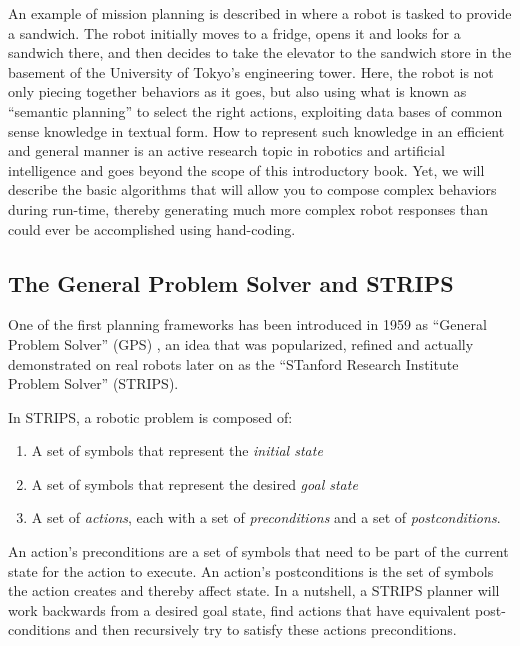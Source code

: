 An example of mission planning is described in \cite{saito2011semantic} where a robot is tasked to provide a sandwich. The robot initially moves to a fridge, opens it and looks for a sandwich there, and then decides to take the elevator to the sandwich store in the basement of the University of Tokyo's engineering tower. Here, the robot is not only piecing together behaviors as it goes, but also using what is known as ``semantic planning'' to select the right actions, exploiting data bases of common sense knowledge in textual form. How to represent such knowledge in an efficient and general manner is an active research topic in robotics and artificial intelligence and goes beyond the scope of this introductory book. Yet, we will describe the basic algorithms that will allow you to compose complex behaviors during run-time, thereby generating much more complex robot responses than could ever be accomplished using hand-coding.

\subsection{The General Problem Solver and STRIPS}
One of the first planning frameworks has been introduced in 1959 as ``General Problem Solver'' (GPS) \cite{newell1959report,}, an idea that was popularized, refined and actually demonstrated on real robots later on as the ``STanford Research Institute Problem Solver'' (STRIPS)\cite{fikes1971strips}. 

In STRIPS, a robotic problem is composed of:

\begin{enumerate}
\item A set of symbols that represent the \emph{initial state}
\item A set of symbols that represent the desired \emph{goal state}
\item A set of \emph{actions}, each with a set of \emph{preconditions} and a set of \emph{postconditions}. 
\end{enumerate} 

An action's preconditions are a set of symbols that need to be part of the current state for the action to execute. An action's postconditions is the set of symbols the action creates and thereby affect state. In a nutshell, a STRIPS planner will work backwards from a desired goal state, find actions that have equivalent post-conditions and then recursively try to satisfy these actions preconditions. 

